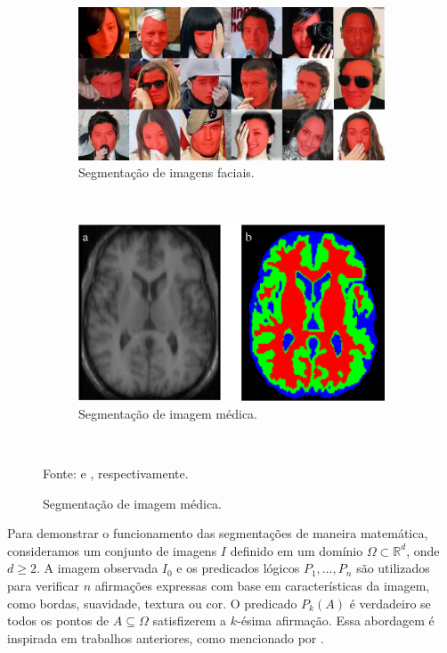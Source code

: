\begin{figure}[H]
   \caption{Exemplos de segmentações de imagens.}
   \centering
   \label{segment:fig:1}
    \begin{subfigure}[t]{0.6\textwidth}
        \centering
        \includegraphics[width=1\linewidth]{recursos/imagens/image_seg/faces.png}
        \caption{Segmentação de imagens faciais.}
        \label{segment:fig:1.1}
    \end{subfigure}%
    ~ 

    \begin{subfigure}[t]{0.6\textwidth}
        \centering
        \includegraphics[width=1\linewidth]{recursos/imagens/image_seg/cerebro.png}
        \caption{Segmentação de imagem médica.}
        \label{segment:fig:1.2}
    \end{subfigure}%
    ~

    Fonte: \cite{Nirkin2018} e \cite{Withey2008}, respectivamente.
\end{figure}

Para demonstrar o funcionamento das segmentações de maneira matemática, consideramos um conjunto de imagens $I$ definido em um domínio $\Omega \subset \mathbb{R}^d$, onde $d \geq 2$. A imagem observada $I_0$ e os predicados lógicos $P_1, \ldots, P_n$ são utilizados para verificar $n$ afirmações expressas com base em características da imagem, como bordas, suavidade, textura ou cor. O predicado $P_k(A)$ é verdadeiro se todos os pontos de $A \subseteq \Omega$ satisfizerem a $k$-ésima afirmação. Essa abordagem é inspirada em trabalhos anteriores, como mencionado por \cite{antonelli2022view}.

